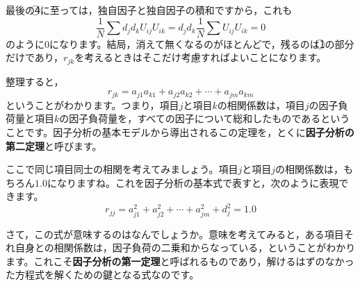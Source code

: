\documentclass{ltjsbook}
\begin{document}
最後の\textcircled{\scriptsize 4}に至っては，独自因子と独自因子の積和ですから，これも
\begin{equation}
    \frac{1}{N}\sum d_{j}d_{k}U_{ij}U_{ik}=d_{j}d_{k}\frac{1}{N}\sum U_{ij}U_{ik}=0
\end{equation}
のように$0$になります。結局，消えて無くなるのがほとんどで，残るのは\textcircled{1}の部分だけであり，$r_{jk}$を考えるときはそこだけ考慮すればよいことになります。

整理すると，
\begin{equation}
    r_{jk}=a_{j1}a_{k1}+a_{j2}a_{k2}+ \cdots +a_{jm}a_{km}
\end{equation}
ということがわかります。つまり，項目$j$と項目$k$の相関係数は，項目$j$の因子負荷量と項目$k$の因子負荷量を，すべての因子について総和したものであるということです。因子分析の基本モデルから導出されるこの定理を，とくに\textbf{因子分析の第二定理}と呼びます。

ここで同じ項目同士の相関を考えてみましょう。項目$j$と項目$j$の相関係数は，もちろん$1.0$になりますね。これを因子分析の基本式で表すと，次のように表現できます。
\begin{equation}
    \label{facteo1}
    r_{jj}=a_{j1}^2+a_{j2}^2+ \cdots + a_{jm}^2 + d_j^2 = 1.0
\end{equation}

さて，この式が意味するのはなんでしょうか。意味を考えてみると，ある項目それ自身との相関係数は，因子負荷の二乗和からなっている，ということがわかります。これこそ\textbf{因子分析の第一定理}と呼ばれるものであり，解けるはずのなかった方程式を解くための鍵となる式なのです。
\end{document}
